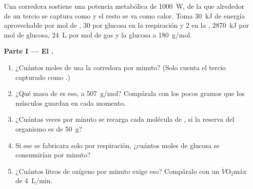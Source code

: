 \begin{problem}
\label{pb:g12:respiration-fermentation:1}
Una corredora sostiene una potencia metabólica de \qty{1000}{W}, de la
que alrededor de un tercio se captura como  y el resto se va como
calor. Toma \qty{30}{kJ} de energía aprovechable por mol de , 30 
por glucosa en la respiración y 2 en la , \qty{2870}{kJ}
por mol de glucosa, \qty{24}{L} por mol de gas y la glucosa a
\qty{180}{g/mol}.

\medskip
\noindent\textbf{Parte I --- El .}
\begin{enumerate}
  \item ¿Cuántos moles de  usa la corredora por minuto? (Solo cuenta
        el tercio capturado como .)
  \item ¿Qué masa de  es eso, a \qty{507}{g/mol}? Compárala con los
        pocos gramos que los músculos guardan en cada momento.
  \item ¿Cuántas veces por minuto se recarga cada molécula de , si
        la reserva del organismo es de \qty{50}{g}?
  \item Si ese  se fabricara solo por respiración, ¿cuántos moles de
        glucosa se consumirían por minuto?
  \item ¿Cuántos litros de oxígeno por minuto exige eso? Compáralo con
        un $\dot V\!\mathrm{O_2}$máx de \qty{4}{L/min}.
\end{enumerate}


\end{problem}
